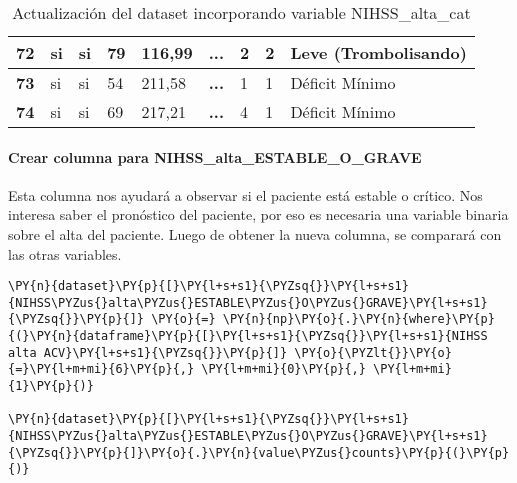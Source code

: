 \begin{table}[H]
{\begin{tabular}{|c|l|l|l|l|c|l|l|l|}
\textbf{72} & si & si & 79 & 116,99 & \textbf{...} & 2 & 2 & Leve (Trombolisando) \\ \hline
\textbf{73} & si & si & 54 & 211,58 & \textbf{...} & 1 & 1 & Déficit Mínimo \\ \hline
\textbf{74} & si & si & 69 & 217,21 & \textbf{...} & 4 & 1 & Déficit Mínimo \\ \hline
\end{tabular}%
}
\caption{Actualización del dataset incorporando variable NIHSS\_alta\_cat}
\label{tab:actualizcin nihss_alta_cat}
\end{table}
        
    \hypertarget{crear-columna-para nihss_alta_estable_o_grave}{%
\paragraph{Crear columna para NIHSS\_alta\_ESTABLE\_O\_GRAVE}\label{crear-columna-para-nihss_alta_estable_o_grave}}

	Esta columna nos ayudará a observar si el paciente está estable o crítico. Nos interesa saber el pronóstico del paciente, por eso es necesaria una variable binaria sobre el alta del paciente. Luego de obtener la nueva columna, se comparará con las otras variables.

    \begin{tcolorbox}[breakable, size=fbox, boxrule=1pt, pad at break*=1mm,colback=cellbackground, colframe=cellborder]
\begin{Verbatim}[commandchars=\\\{\}]
\PY{n}{dataset}\PY{p}{[}\PY{l+s+s1}{\PYZsq{}}\PY{l+s+s1}{NIHSS\PYZus{}alta\PYZus{}ESTABLE\PYZus{}O\PYZus{}GRAVE}\PY{l+s+s1}{\PYZsq{}}\PY{p}{]} \PY{o}{=} \PY{n}{np}\PY{o}{.}\PY{n}{where}\PY{p}{(}\PY{n}{dataframe}\PY{p}{[}\PY{l+s+s1}{\PYZsq{}}\PY{l+s+s1}{NIHSS alta ACV}\PY{l+s+s1}{\PYZsq{}}\PY{p}{]} \PY{o}{\PYZlt{}}\PY{o}{=}\PY{l+m+mi}{6}\PY{p}{,} \PY{l+m+mi}{0}\PY{p}{,} \PY{l+m+mi}{1}\PY{p}{)}

\PY{n}{dataset}\PY{p}{[}\PY{l+s+s1}{\PYZsq{}}\PY{l+s+s1}{NIHSS\PYZus{}alta\PYZus{}ESTABLE\PYZus{}O\PYZus{}GRAVE}\PY{l+s+s1}{\PYZsq{}}\PY{p}{]}\PY{o}{.}\PY{n}{value\PYZus{}counts}\PY{p}{(}\PY{p}{)}
\end{Verbatim}
\end{tcolorbox}

\begin{table}[H]
\centering
\setlength{\tabcolsep}{5pt}
\caption{Clasificación binaria para la variable NIHSS\_alta\_cat}
\label{tab:Nihss estable o grave}
\end{table}
        
